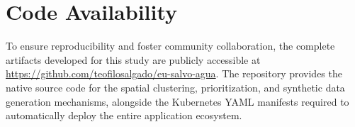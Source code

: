 \documentclass[conference]{IEEEtran}
\begin{document}
\section*{Code Availability}
To ensure reproducibility and foster community collaboration, the complete artifacts developed for this study are publicly accessible at \url{https://github.com/teofilosalgado/eu-salvo-agua}. The repository provides the native source code for the spatial clustering, prioritization, and synthetic data generation mechanisms, alongside the Kubernetes YAML manifests required to automatically deploy the entire application ecosystem.



\end{document}
